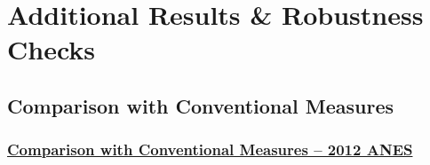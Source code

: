 \section{Additional Results \& Robustness Checks}


\subsection{Comparison with Conventional Measures}
\begin{frame} %
\frametitle{\hyperlink{corplot_components}{Comparison with Conventional Measures -- 2012 ANES}}\label{corplot}
\begin{figure}
\end{figure}
\end{frame}

